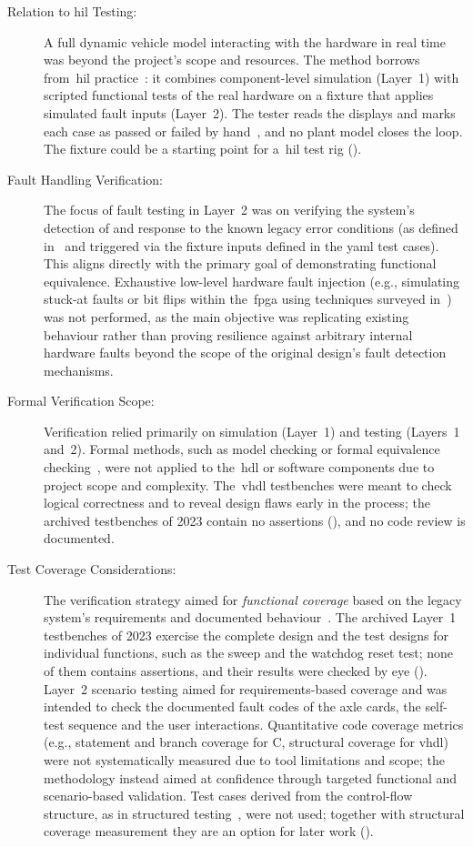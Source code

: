 \begin{description}
	\item[Relation to \gls{hil} Testing:] A full dynamic vehicle model interacting with the hardware in real time was beyond the project's scope and resources. The method borrows from~\gls{hil} practice~\cite{hil_rail_suspension_2023, zhou_wu_2020}: it combines component-level simulation (Layer~1) with scripted functional tests of the real hardware on a fixture that applies simulated fault inputs (Layer~2). The tester reads the displays and marks each case as passed or failed by hand~\cite[Sec.~9.2]{dolata2023}, and no plant model closes the loop. The fixture could be a starting point for a~\gls{hil} test rig ().
	\item[Fault Handling Verification:] The focus of fault testing in Layer~2 was on verifying the system's detection of and response to the known legacy error conditions (as defined in~\cite[Blatt~20/25]{rexroth1992wsp} and triggered via the fixture inputs defined in the \gls{yaml} test cases). This aligns directly with the primary goal of demonstrating functional equivalence. Exhaustive low-level hardware fault injection (e.g., simulating stuck-at faults or bit flips within the~\gls{fpga} using techniques surveyed in~\cite{ziade2004faultinjection}) was not performed, as the main objective was replicating existing behaviour rather than proving resilience against arbitrary internal hardware faults beyond the scope of the original design's fault detection mechanisms.
	\item[Formal Verification Scope:] Verification relied primarily on simulation (Layer~1) and testing (Layers~1 and~2). Formal methods, such as model checking or formal equivalence checking~\cite{formal_verification_rail_2023, mneimneh2005sequential}, were not applied to the~\gls{hdl} or software components due to project scope and complexity. The~\gls{vhdl} testbenches were meant to check logical correctness and to reveal design flaws early in the process; the archived testbenches of 2023 contain no assertions (), and no code review is documented.
	\item[Test Coverage Considerations:] The verification strategy aimed for \textit{functional coverage} based on the legacy system's requirements and documented behaviour~\cite{rexroth1992wsp}. The archived Layer~1 testbenches of 2023 exercise the complete design and the test designs for individual functions, such as the sweep and the watchdog reset test; none of them contains assertions, and their results were checked by eye (). Layer~2 scenario testing aimed for requirements-based coverage and was intended to check the documented fault codes of the axle cards, the self-test sequence and the user interactions. Quantitative code coverage metrics (e.g., statement and branch coverage for C, structural coverage for \gls{vhdl}) were not systematically measured due to tool limitations and scope; the methodology instead aimed at confidence through targeted functional and scenario-based validation. Test cases derived from the control-flow structure, as in structured testing~\cite{watson1996}, were not used; together with structural coverage measurement they are an option for later work ().

\end{description}
